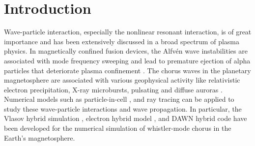 \documentclass[times,12pt,3p,longtitle]{elsarticle}
\begin{document}
\section{Introduction}
Wave-particle interaction, especially the nonlinear resonant interaction, is of great importance and has been extensively discussed in a broad spectrum of plasma physics. 
In magnetically confined fusion devices, the Alfv\'en wave instabilities 
are associated with mode frequency sweeping 
\cite{chen2016,wang2018,wang2012,wang2012a} 
and lead to premature ejection of alpha particles that deteriorate plasma confinement \cite{fasoli2007}.
The chorus waves  
in the planetary magnetosphere \cite{tsurutani1974} 
are associated with various geophysical activity like relativistic electron precipitation, X-ray microbursts, pulsating and diffuse auroras \cite{kasahara2018,reeves2013,thorne2013}.
Numerical models such as 
particle-in-cell \cite{chen2015a,xiao2013variational,xiao2020explicit}, and ray tracing \cite{xie2022} can be applied to study these wave-particle interactions and wave propagation. 
In particular, the Vlasov  hybrid simulation  \cite{vhscode},
electron hybrid model \cite{katoh2016}, and DAWN hybrid code \cite{tao2014a} 
have been developed for the numerical simulation of whistler-mode chorus in the Earth's magnetosphere.  
\end{document}
